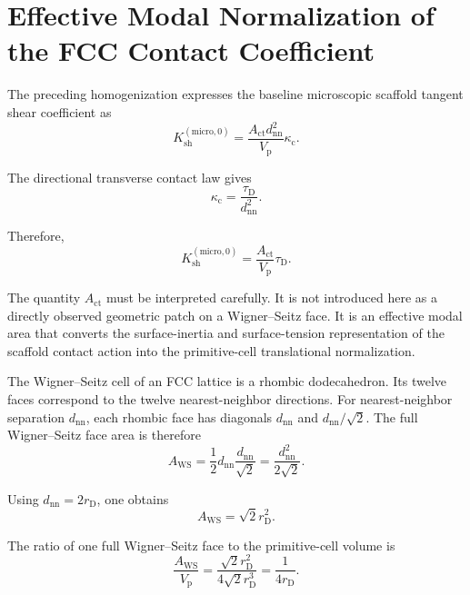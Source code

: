 \section{Effective Modal Normalization of the FCC Contact Coefficient}

The preceding homogenization expresses the baseline microscopic scaffold tangent shear coefficient as
\begin{equation}
    K_{\mathrm{sh}}^{(\mathrm{micro},0)} = \frac{A_{\mathrm{ct}}d_{\mathrm{nn}}^2}{V_{\mathrm{p}}}\kappa_{\mathrm{c}}.
\end{equation}

The directional transverse contact law gives
\begin{equation}
    \kappa_{\mathrm{c}} = \frac{\tau_{\mathrm{D}}}{d_{\mathrm{nn}}^2}.
\end{equation}

Therefore,
\begin{equation}
    K_{\mathrm{sh}}^{(\mathrm{micro},0)} = \frac{A_{\mathrm{ct}}}{V_{\mathrm{p}}}\tau_{\mathrm{D}}.
\end{equation}

The quantity $A_{\mathrm{ct}}$ must be interpreted carefully. It is not introduced here as a directly observed geometric patch on a Wigner--Seitz face. It is an effective modal area that converts the surface-inertia and surface-tension representation of the scaffold contact action into the primitive-cell translational normalization.

The Wigner--Seitz cell of an FCC lattice is a rhombic dodecahedron. Its twelve faces correspond to the twelve nearest-neighbor directions. For nearest-neighbor separation $d_{\mathrm{nn}}$, each rhombic face has diagonals $d_{\mathrm{nn}}$ and $d_{\mathrm{nn}}/\sqrt{2}$. The full Wigner--Seitz face area is therefore
\begin{equation}
    A_{\mathrm{WS}} = \frac{1}{2}d_{\mathrm{nn}}\frac{d_{\mathrm{nn}}}{\sqrt{2}} = \frac{d_{\mathrm{nn}}^2}{2\sqrt{2}}.
\end{equation}

Using $d_{\mathrm{nn}}=2r_{\mathrm{D}}$, one obtains
\begin{equation}
    A_{\mathrm{WS}} = \sqrt{2}r_{\mathrm{D}}^2.
\end{equation}

The ratio of one full Wigner--Seitz face to the primitive-cell volume is
\begin{equation}
    \frac{A_{\mathrm{WS}}}{V_{\mathrm{p}}} = \frac{\sqrt{2}r_{\mathrm{D}}^2}{4\sqrt{2}r_{\mathrm{D}}^3} = \frac{1}{4r_{\mathrm{D}}}.
\end{equation}

